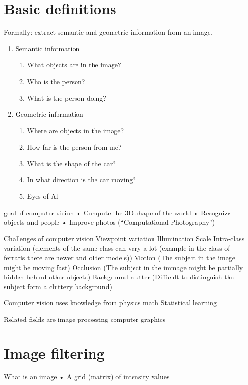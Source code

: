 \section{Basic definitions}
Formally: extract semantic
and geometric information
from an image.


\begin{enumerate}
    \item Semantic information
          \begin{enumerate}
              \item What objects are in the image?
              \item Who is the person?
              \item What is the person doing?
          \end{enumerate}
    \item Geometric information
          \begin{enumerate}
              \item Where are objects in the image?
              \item How far is the person from me?
              \item What is the shape of the car?
              \item In what direction is the car moving?
              \item Eyes of AI
          \end{enumerate}
\end{enumerate}


goal of computer vision
• Compute the 3D shape of the world
• Recognize objects and people
• Improve photos (“Computational Photography”)


Challenges of computer vision
Viewpoint variation
Illumination
Scale
Intra-class variation (elements of the same class can vary a lot (example in the class of ferraris there are newer and older models))
Motion (The subject in the image might be moving fast)
Occlusion (The subject in the immage might be partially hidden behind other objects)
Background clutter (Difficult to distinguish the subject form a cluttery background)



Computer vision uses knowledge from
physics
math
Statistical learning

Related fields are
image processing
computer graphics


\section{Image filtering}
What is an image
• A grid (matrix) of intensity values

